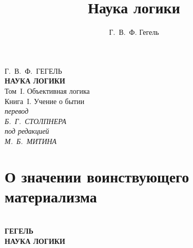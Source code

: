 \documentclass[b5paper, 11pt, twoside, onecolumn, openany]{memoir}
\author{Г.~В.~Ф. Гегель}
\title{Наука логики}
\date{}
\begin{document}
\frontmatter
\pagestyle{empty}

{\centering
  {\Large Г.~В.~Ф.~ГЕГЕЛЬ} \\
  \vspace{130pt}
  \textbf{\Huge НАУКА ЛОГИКИ} \\
  \vspace{12pt}
  {\Large Том~I. Объективная логика} \\
  \vspace{8pt}
  {\large Книга~I. Учение о бытии} \\
  \vspace{45pt}
  \textit{перевод} \\
  \textit{Б.~Г.~СТОЛПНЕРА} \\
  \vspace{10pt}
  \textit{под редакцией} \\
  \textit{М.~Б.~МИТИНА}
\par}

\clearpage

\pagestyle{plain}
\setcounter{page}{1}
\part[\normalsize{\em Ленин,} О значении воинствующего материализма]%
     {О значении воинствующего материализма}


\cleardoublepage
\pagestyle{empty}

{\centering
  \ \\
  \vspace{50mm}
  {\huge\bfseries ГЕГЕЛЬ} \\
  \vspace{50mm}
  {\Huge\bfseries НАУКА ЛОГИКИ}
\par}


\end{document}
